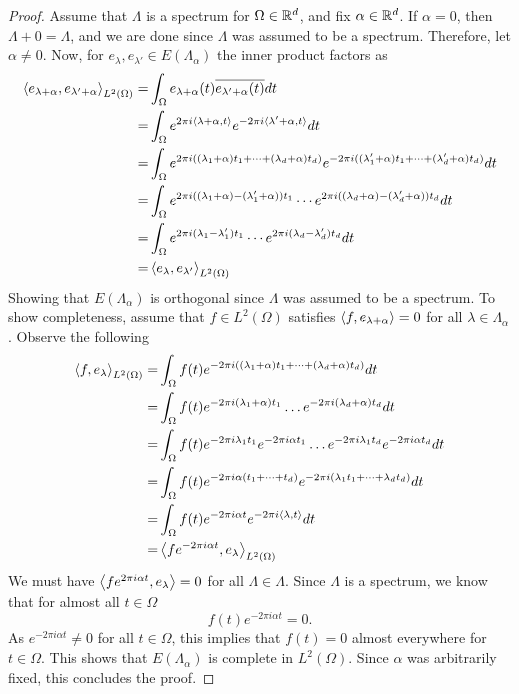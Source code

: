 \documentclass[../thesis.tex]{subfiles}
\begin{document}
\begin{proof}
    Assume that $\Lambda$ is a spectrum for $\Omega\in \mathbb{R}^d$, and fix $\alpha\in \mathbb{R}^d$. If $\alpha = 0$, then $\Lambda + 0 = \Lambda$, and we are done since $\Lambda$ was assumed to be a spectrum. Therefore, let $\alpha\neq 0$. Now, for $e_{\lambda},e_{\lambda'} \in E(\Lambda_\alpha)$ the inner product factors as 
    \begin{align*}
        \left \langle e_{\lambda+\alpha},e_{\lambda'+\alpha} \right \rangle_{L^2(\Omega)} =& \int_{\Omega} e_{\lambda+\alpha}(t)\overline{e_{\lambda'+\alpha}(t)} dt\\
        =& \int_{\Omega} e^{2\pi i \langle\lambda+\alpha,t\rangle} e^{-2 \pi i \langle\lambda'+\alpha,t\rangle} dt\\
        =& \int_{\Omega} e^{2\pi i  ((\lambda_1+\alpha)t_1 + \dots +(\lambda_d+\alpha) t_d)} e^{-2\pi i  ((\lambda_1'+\alpha) t_1 + \dots +(\lambda_d'+\alpha) t_d)} dt\\
        =& \int_{\Omega} e^{2\pi i  ((\lambda_1+\alpha) -(\lambda_1'+\alpha))t_1} \cdots e^{2\pi i  ((\lambda_d+\alpha) -(\lambda_d'+\alpha))t_d} dt\\
        =& \int_{\Omega} e^{2\pi i  (\lambda_1 -\lambda_1')t_1} \cdots e^{2\pi i  (\lambda_d -\lambda_d')t_d} dt\\
        =& \left \langle e_{\lambda},e_{\lambda'} \right \rangle_{L^2(\Omega)}
    \end{align*}
    Showing that $E(\Lambda_\alpha)$ is orthogonal since $\Lambda$ was assumed to be a spectrum. To show completeness, assume that $f\in L^2(\Omega)$ satisfies $\left \langle f,e_{\lambda + \alpha} \right \rangle = 0$ for all $\lambda\in \Lambda_\alpha$. Observe the following
    \begin{align*}
        \left \langle f,e_{\lambda} \right \rangle_{L^2(\Omega)} =& \int_{\Omega} f(t) e^{-2\pi i  ((\lambda_1+\alpha) t_1 + \dots +(\lambda_d+\alpha) t_d)} dt\\
        =& \int_{\Omega} f(t) e^{-2\pi i  (\lambda_1+\alpha)t_1} \dots e^{-2\pi i  (\lambda_d+\alpha)t_d} dt\\
        =& \int_{\Omega} f(t) e^{-2\pi i  \lambda_1 t_1}e^{-2\pi i  \alpha t_1} \dots e^{-2\pi i  \lambda_1 t_d}e^{-2\pi i  \alpha t_d} dt\\
        =& \int_{\Omega} f(t) e^{-2\pi i  \alpha (t_1 + \dots + t_d) }  e^{-2\pi i  (\lambda_1t_1 + \dots + \lambda_d t_d)}dt\\
        =& \int_{\Omega} f(t) e^{-2\pi i \alpha t }  e^{-2\pi i  \langle\lambda, t\rangle}dt\\
        =& \left \langle f e^{-2\pi i  \alpha t },e_{\lambda} \right \rangle_{L^2(\Omega)}
    \end{align*}
    We must have $\left \langle f e^{2\pi i  \alpha t },e_{\lambda} \right \rangle = 0$ for all $\Lambda \in \Lambda$. Since $\Lambda$ is a spectrum, we know that for almost all $t \in \Omega$ 
    \begin{equation*}
        f(t)e^{-2 \pi i \alpha t} = 0.
    \end{equation*}
    As $e^{-2 \pi i \alpha t} \neq 0$ for all $t\in \Omega$, this implies that $f(t) = 0$ almost everywhere for $t\in \Omega$. This shows that $E(\Lambda_\alpha)$ is complete in $L^2(\Omega)$. Since $\alpha$ was arbitrarily fixed, this concludes the proof. 
\end{proof}
\end{document}
